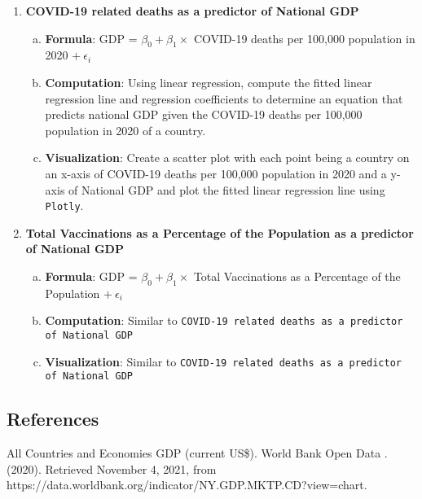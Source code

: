 \documentclass[fontsize=11pt]{article}
\begin{document}
\begin{enumerate}
        \newpage

        \item \textbf{COVID-19 related deaths as a predictor of National GDP}
            \begin{enumerate}[(a)]
                \item \textbf{Formula}: GDP = $\beta_{0} + \beta_{1} \times$ COVID-19 deaths per 100,000 population in 2020 $+ \  \epsilon_{i}$
                \item \textbf{Computation}: Using linear regression, compute the fitted linear regression line and regression coefficients to determine an equation that predicts national GDP given the COVID-19 deaths per 100,000 population in 2020 of a country.
                \item \textbf{Visualization}: Create a scatter plot with each point being a country on an x-axis of COVID-19 deaths per 100,000 population in 2020 and a y-axis of National GDP and plot the fitted linear regression line using \texttt{Plotly}.
            \end{enumerate}
        \item \textbf{Total Vaccinations as a Percentage of the Population as a predictor of National GDP}
            \begin{enumerate}[(a)]
                \item \textbf{Formula}: GDP = $\beta_{0} + \beta_{1} \times$ Total Vaccinations as a Percentage of the Population $+ \ \epsilon_{i}$
                \item \textbf{Computation}: Similar to \texttt{COVID-19 related deaths as a predictor of National GDP}
                \item \textbf{Visualization}: Similar to \texttt{COVID-19 related deaths as a predictor of National GDP}
            \end{enumerate}
    \end{enumerate}

\newpage
\begin{center}
\section*{References}
\end{center}

    \item All Countries and Economies GDP (current US\$). World Bank Open Data . (2020). Retrieved November 4, 2021, \indent from https://data.worldbank.org/indicator/NY.GDP.MKTP.CD?view=chart.  \\
\end{document}
